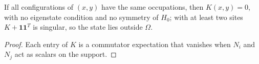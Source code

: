 \begin{theorem}[Equal occupations force $K=0$]
  \label{thm:kfb_eq_zero_of_occ_const}
  \leanok
  If all configurations of $(x,y)$ have the same occupations, then $K(x,y)=0$, with no eigenstate condition and no
  symmetry of $H_0$; with at least two sites $K+\mathbf 1\mathbf 1^T$ is singular, so the state lies outside $\Omega$.
\end{theorem}
\begin{proof}
  \leanok
  Each entry of $K$ is a commutator expectation that vanishes when $N_i$ and $N_j$ act as scalars on the support.
\end{proof}
